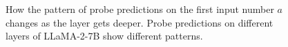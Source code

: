 \documentclass[11pt]{article}
\begin{document}
\begin{figure}[ht]
    \centering
    \caption{How the pattern of probe predictions on the first input number $a$ changes as the layer gets deeper. Probe predictions on different layers of LLaMA-2-7B show different patterns.}
    \label{fig:evolution}
\end{figure}
\end{document}
